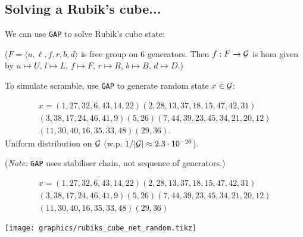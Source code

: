 \subsection{Solving a Rubik's cube...}

\begin{slide}
    We can use \texttt{GAP} to solve Rubik's cube state: \pause

    {\scriptsize }

    ($F = \langle u,\ell,f,r,b,d \rangle$ is free group on 6 generators. Then $f : F \to \mathcal{G}$ is hom given by $u \mapsto U$, $l \mapsto L$, $f \mapsto F$, $r \mapsto R$, $b \mapsto B$, $d \mapsto D$.)
\end{slide}

\begin{slide}
    To simulate scramble, use \texttt{GAP} to generate random state $x \in \mathcal{G}$: \pause

    {\scriptsize }
    \vspace{-0.5cm}

    {\footnotesize \begin{multline*}
            x = (1,27,32,6,43,14,22)(2,28,13,37,18,15,47,42,31)\\
            (3,38,17,24,46,41,9)(5,26)(7,44,39,23,45,34,21,20,12)\\
            (11,30,40,16,35,33,48)(29,36).
        \end{multline*}} \pause
    Uniform distribution on $\mathcal{G}$ (w.p. $1/|\mathcal{G}| \approx 2.3 \cdot 10^{-20}$).

    (\textit{Note:} \texttt{GAP} uses stabiliser chain, not sequence of generators.)
\end{slide}

\begin{slide}
    {\footnotesize \begin{multline*}
            x = (1,27,32,6,43,14,22)(2,28,13,37,18,15,47,42,31)\\
            (3,38,17,24,46,41,9)(5,26)(7,44,39,23,45,34,21,20,12)\\
            (11,30,40,16,35,33,48)(29,36)
        \end{multline*}}
    \vspace{-1cm}

    \begin{center}
        \texttt{[image: graphics/rubiks\_cube\_net\_random.tikz]}%
    \end{center}
\end{slide}

